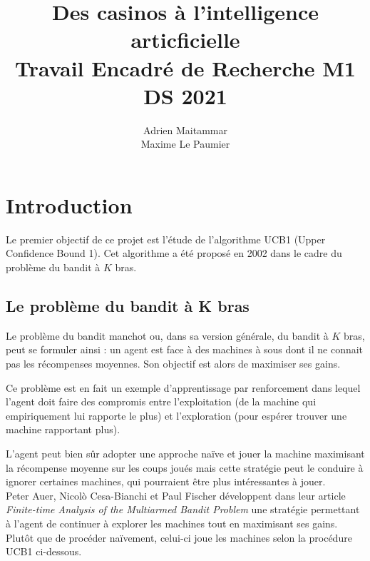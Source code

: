 \documentclass[a4paper]{article}
\title{\huge Des casinos à l'intelligence articficielle\\[15pt] \small Travail Encadré de Recherche M1 DS 2021}
\author{Adrien Maitammar \\ Maxime Le Paumier}
\theoremstyle{definition}
\begin{document}
\maketitle

\vspace{40pt}

\renewcommand{\contentsname}{Sommaire}
\tableofcontents
 \clearpage
 
 
\section{Introduction}

\vspace{5pt}

Le premier objectif de ce projet est l'étude de l'algorithme UCB1 (Upper Confidence Bound 1). Cet algorithme a été proposé en 2002 dans le cadre du problème du bandit à $K$ bras.

\subsection{Le problème du bandit à K bras}

Le problème du bandit manchot ou, dans sa version générale, du bandit à $K$ bras, peut se formuler ainsi : un agent est face à des machines à sous dont il ne connait pas les récompenses moyennes. Son objectif est alors de maximiser ses gains.

Ce problème est en fait un exemple d'apprentissage par renforcement dans lequel l'agent doit faire des compromis entre l'exploitation (de la machine qui empiriquement lui rapporte le plus) et l'exploration (pour espérer trouver une machine rapportant plus).

L'agent peut bien sûr adopter une approche naïve et jouer la machine maximisant la récompense moyenne sur les coups joués mais  cette stratégie peut le conduire à ignorer certaines machines, qui pourraient être plus intéressantes à jouer. \\
 
Peter Auer, Nicol\`o Cesa-Bianchi et Paul Fischer développent dans leur article \textit{Finite-time Analysis of the Multiarmed Bandit
Problem} une stratégie permettant à l'agent de continuer à explorer les machines tout en maximisant ses gains. Plutôt que de procéder naïvement, celui-ci joue les machines selon la procédure UCB1 ci-dessous.

\vspace{10pt}
\end{document}
